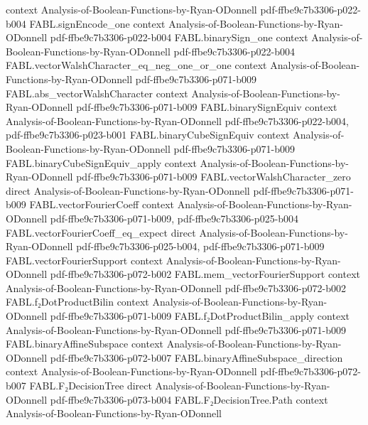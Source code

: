 \begin{theorem}
  {context}
  {Analysis-of-Boolean-Functions-by-Ryan-ODonnell}
  {pdf-ffbe9c7b3306-p022-b004}
\proofstep
  {FABL.signEncode_one}
  {context}
  {Analysis-of-Boolean-Functions-by-Ryan-ODonnell}
  {pdf-ffbe9c7b3306-p022-b004}
\proofstep
  {FABL.binarySign_one}
  {context}
  {Analysis-of-Boolean-Functions-by-Ryan-ODonnell}
  {pdf-ffbe9c7b3306-p022-b004}
\proofstep
  {FABL.vectorWalshCharacter_eq_neg_one_or_one}
  {context}
  {Analysis-of-Boolean-Functions-by-Ryan-ODonnell}
  {pdf-ffbe9c7b3306-p071-b009}
\proofstep
  {FABL.abs_vectorWalshCharacter}
  {context}
  {Analysis-of-Boolean-Functions-by-Ryan-ODonnell}
  {pdf-ffbe9c7b3306-p071-b009}
\proofstep
  {FABL.binarySignEquiv}
  {context}
  {Analysis-of-Boolean-Functions-by-Ryan-ODonnell}
  {pdf-ffbe9c7b3306-p022-b004,
    pdf-ffbe9c7b3306-p023-b001}
\proofstep
  {FABL.binaryCubeSignEquiv}
  {context}
  {Analysis-of-Boolean-Functions-by-Ryan-ODonnell}
  {pdf-ffbe9c7b3306-p071-b009}
\proofstep
  {FABL.binaryCubeSignEquiv_apply}
  {context}
  {Analysis-of-Boolean-Functions-by-Ryan-ODonnell}
  {pdf-ffbe9c7b3306-p071-b009}
\proofstep
  {FABL.vectorWalshCharacter_zero}
  {direct}
  {Analysis-of-Boolean-Functions-by-Ryan-ODonnell}
  {pdf-ffbe9c7b3306-p071-b009}
\proofstep
  {FABL.vectorFourierCoeff}
  {context}
  {Analysis-of-Boolean-Functions-by-Ryan-ODonnell}
  {pdf-ffbe9c7b3306-p071-b009,
    pdf-ffbe9c7b3306-p025-b004}
\proofstep
  {FABL.vectorFourierCoeff_eq_expect}
  {direct}
  {Analysis-of-Boolean-Functions-by-Ryan-ODonnell}
  {pdf-ffbe9c7b3306-p025-b004,
    pdf-ffbe9c7b3306-p071-b009}
\proofstep
  {FABL.vectorFourierSupport}
  {context}
  {Analysis-of-Boolean-Functions-by-Ryan-ODonnell}
  {pdf-ffbe9c7b3306-p072-b002}
\proofstep
  {FABL.mem_vectorFourierSupport}
  {context}
  {Analysis-of-Boolean-Functions-by-Ryan-ODonnell}
  {pdf-ffbe9c7b3306-p072-b002}
\proofstep
  {FABL.f₂DotProductBilin}
  {context}
  {Analysis-of-Boolean-Functions-by-Ryan-ODonnell}
  {pdf-ffbe9c7b3306-p071-b009}
\proofstep
  {FABL.f₂DotProductBilin_apply}
  {context}
  {Analysis-of-Boolean-Functions-by-Ryan-ODonnell}
  {pdf-ffbe9c7b3306-p071-b009}
\proofstep
  {FABL.binaryAffineSubspace}
  {context}
  {Analysis-of-Boolean-Functions-by-Ryan-ODonnell}
  {pdf-ffbe9c7b3306-p072-b007}
\proofstep
  {FABL.binaryAffineSubspace_direction}
  {context}
  {Analysis-of-Boolean-Functions-by-Ryan-ODonnell}
  {pdf-ffbe9c7b3306-p072-b007}
\proofstep
  {FABL.F₂DecisionTree}
  {direct}
  {Analysis-of-Boolean-Functions-by-Ryan-ODonnell}
  {pdf-ffbe9c7b3306-p073-b004}
\proofstep
  {FABL.F₂DecisionTree.Path}
  {context}
  {Analysis-of-Boolean-Functions-by-Ryan-ODonnell}

\end{theorem}
